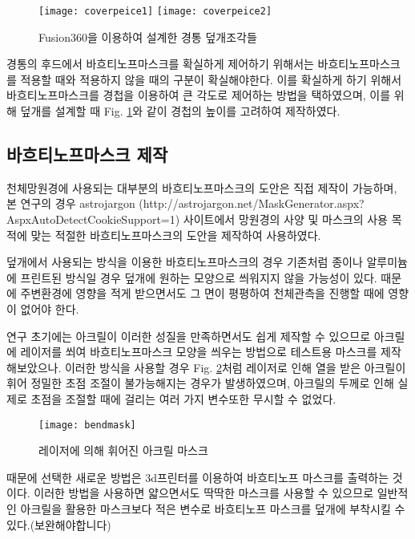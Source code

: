 \bigskip
\bigskip
\begin{figure}[h]
	\begin{center}
		\texttt{[image: coverpeice1]}
		\texttt{[image: coverpeice2]}
	\end{center}
	\caption{Fusion360을 이용하여 설계한 경통 덮개조각들}
	\label{coverpeice}
\end{figure}

경통의 후드에서 바흐티노프마스크를 확실하게 제어하기 위해서는 바흐티노프마스크를 적용할 때와 적용하지 않을 때의 구분이 확실해야한다. 이를 확실하게 하기 위해서 바흐티노프마스크를 경첩을 이용하여 큰 각도로 제어하는 방법을 택하였으며, 이를 위해 덮개를 설계할 때 Fig. \ref{coverpeice}와 같이 경첩의 높이를 고려하여 제작하였다.

\subsection{바흐티노프마스크 제작}
천체망원경에 사용되는 대부분의 바흐티노프마스크의 도안은 직접 제작이 가능하며, 본 연구의 경우 astrojargon (http://astrojargon.net/MaskGenerator.aspx?AspxAutoDetectCookieSupport=1) 사이트에서 망원경의 사양 및 마스크의 사용 목적에 맞는 적절한 바흐티노프마스크의 도안을 제작하여 사용하였다.

덮개에서 사용되는 방식을 이용한 바흐티노프마스크의 경우 기존처럼 종이나 알루미늄에 프린트된 방식일 경우 덮개에 원하는 모양으로 씌워지지 않을 가능성이 있다. 때문에 주변환경에 영향을 적게 받으면서도 그 면이 평평하여 천체관측을 진행할 때에 영향이 없어야 한다. 


연구 초기에는 아크릴이 이러한 성질을 만족하면서도 쉽게 제작할 수 있으므로 아크릴에 레이저를 쐬여 바흐티노프마스크 모양을 씌우는 방법으로 테스트용 마스크를 제작해보았으나. 이러한 방식을 사용할 경우 Fig. \ref{bendmask}처럼 레이저로 인해 열을 받은 아크릴이 휘어 정밀한 초점 조절이 불가능해지는 경우가 발생하였으며, 아크릴의 두께로 인해 실제로 초점을 조절할 때에 걸리는 여러 가지 변수또한 무시할 수 없었다.

\bigskip
\begin{figure}[h]
	\begin{center}
		\texttt{[image: bendmask]}
	\end{center}
	\caption{레이저에 의해 휘어진 아크릴 마스크}
	\label{bendmask}
\end{figure}


때문에 선택한 새로운 방법은 3d프린터를 이용하여 바흐티노프 마스크를 출력하는 것이다. 이러한 방법을 사용하면 얇으면서도 딱딱한 마스크를 사용할 수 있으므로 일반적인 아크릴을 활용한 마스크보다 적은 변수로 바흐티노프 마스크를 덮개에 부착시킬 수 있다.(보완해야합니다)

